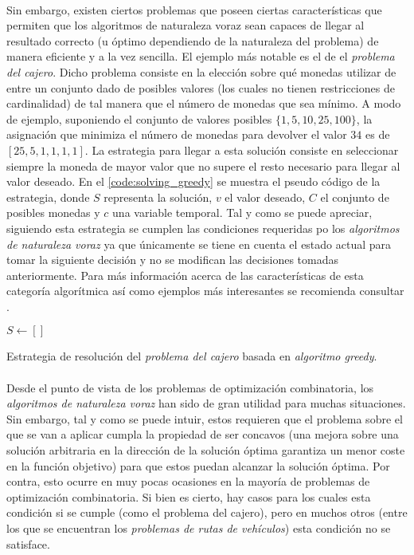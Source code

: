 \documentclass{subfiles}
\begin{document}
        \paragraph{}
        Sin embargo, existen ciertos problemas que poseen ciertas características que permiten que los algoritmos de naturaleza voraz sean capaces de llegar al resultado correcto (u óptimo dependiendo de la naturaleza del problema) de manera eficiente y a la vez sencilla. El ejemplo más notable es el de el \emph{problema del cajero}. Dicho problema consiste en la elección sobre qué monedas utilizar de entre un conjunto dado de posibles valores (los cuales no tienen restricciones de cardinalidad) de tal manera que el número de monedas que sea mínimo. A modo de ejemplo, suponiendo el conjunto de valores posibles $\{1,5,10, 25, 100\}$, la asignación que minimiza el número de monedas para devolver el valor $34$ es de $[25, 5, 1, 1, 1, 1]$. La estrategia para llegar a esta solución consiste en seleccionar siempre la moneda de mayor valor que no supere el resto necesario para llegar al valor deseado. En el \cref{code:solving_greedy} se muestra el pseudo código de la estrategia, donde $S$ representa la solución, $v$ el valor deseado, $C$ el conjunto de posibles monedas y $c$ una variable temporal. Tal y como se puede apreciar, siguiendo esta estrategia se cumplen las condiciones requeridas po los \emph{algoritmos de naturaleza voraz} ya que únicamente se tiene en cuenta el estado actual para tomar la siguiente decisión y no se modifican las decisiones tomadas anteriormente. Para más información acerca de las características de esta categoría algorítmica así como ejemplos más interesantes se recomienda consultar \cite{cormen2009introduction}.

        \begin{algorithm}[ht]
          \SetAlgoLined
          $S \gets [] $\;
          \caption{Estrategia de resolución del \emph{problema del cajero} basada en \emph{algoritmo greedy}.}
          \label{code:solving_greedy}
        \end{algorithm}

        \paragraph{}
        Desde el punto de vista de los problemas de optimización combinatoria, los \emph{algoritmos de naturaleza voraz} han sido de gran utilidad para muchas situaciones. Sin embargo, tal y como se puede intuir, estos requieren que el problema sobre el que se van a aplicar cumpla la propiedad de ser concavos (una mejora sobre una solución arbitraria en la dirección de la solución óptima garantiza un menor coste en la función objetivo) para que estos puedan alcanzar la solución óptima. Por contra, esto ocurre en muy pocas ocasiones en la mayoría de problemas de optimización combinatoria. Si bien es cierto, hay casos para los cuales esta condición si se cumple (como el problema del cajero), pero en muchos otros (entre los que se encuentran los \emph{problemas de rutas de vehículos}) esta condición no se satisface.  
\end{document}
